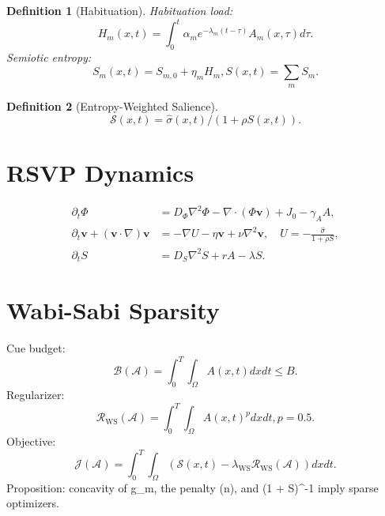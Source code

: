 \documentclass[openany]{book}
\newtheorem{definition}{Definition}[chapter]
\newcommand{\vvec}{\mathbf{v}} %
\newcommand{\Sent}{S} %
\begin{document}
\begin{definition}[Habituation]
Habituation load:
\begin{equation}
\label{eq:habituation}
H_m(x,t) = \int_0^t \alpha_m e^{-\lambda_m (t-\tau)} A_m(x,\tau) d\tau.
\end{equation}
Semiotic entropy:
\begin{equation}
\label{eq:semiotic-entropy}
S_m(x,t) = S_{m,0} + \eta_m H_m, S(x,t) = \sum_m S_m.
\end{equation}
\end{definition}

\begin{definition}[Entropy-Weighted Salience]
\begin{equation}
\label{eq:entropy-suppress}
\mathcal{S}(x,t) = \widehat{\sigma}(x,t) / (1 + \rho S(x,t)).
\end{equation}
\end{definition}

\section{RSVP Dynamics}
\label{sec:rsvp-dynamics}
\begin{align}
\partial_t \Phi &= D_\Phi \nabla^2 \Phi - \nabla \cdot (\Phi \vvec) + J_0 - \gamma_A A, \label{eq:phi} \\
\partial_t \vvec + (\vvec \cdot \nabla)\vvec &= -\nabla U - \eta \vvec + \nu \nabla^2 \vvec, \quad U = -\frac{\widehat{\sigma}}{1 + \rho \Sent}, \label{eq:v} \\
\partial_t \Sent &= D_S \nabla^2 \Sent + r A - \lambda \Sent. \label{eq:S}
\end{align}

\section{Wabi-Sabi Sparsity}
\label{sec:rsvp-wabisabi}
Cue budget:
\begin{equation}
\mathcal{B}(\mathcal{A})=\int_0^T \int_\Omega A(x,t) dx dt \leq B.
\end{equation}
Regularizer:
\begin{equation}
\mathcal{R}_{\mathrm{WS}}(\mathcal{A}) = \int_0^T \int_\Omega A(x,t)^p dx dt, p=0.5.
\end{equation}
Objective:
\begin{equation}
\mathcal{J}(\mathcal{A}) = \int_0^T \int_\Omega (\mathcal{S}(x,t) - \lambda_{\mathrm{WS}} \mathcal{R}_{\mathrm{WS}}(\mathcal{A})) dx dt.
\end{equation}
Proposition: concavity of g_m, the penalty \chi(n), and (1 + \rho S)^{-1} imply sparse optimizers.
\end{document}
